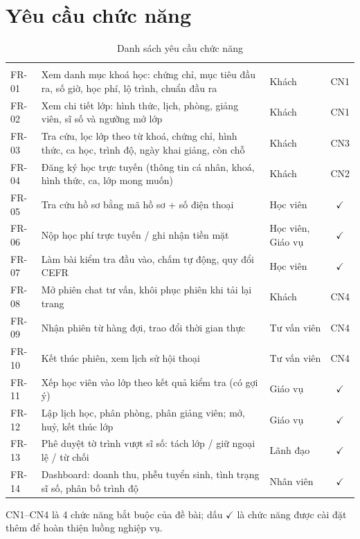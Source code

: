 \section{Yêu cầu chức năng}
\begin{xltabular}{\linewidth}{|l|Y|L{2.6cm}|c|}
  \caption{Danh sách yêu cầu chức năng}\label{tab:fr}\\ \hline
  \headrow {} &  &  &  \\ \hline
  \endfirsthead \hline
  \headrow {} &  &  &  \\ \hline
  \endhead
  FR-01 & Xem danh mục khoá học: chứng chỉ, mục tiêu đầu ra, số giờ, học phí, lộ trình, chuẩn đầu ra & Khách & CN1 \\ \hline
  FR-02 & Xem chi tiết lớp: hình thức, lịch, phòng, giảng viên, sĩ số và ngưỡng mở lớp & Khách & CN1 \\ \hline
  FR-03 & Tra cứu, lọc lớp theo từ khoá, chứng chỉ, hình thức, ca học, trình độ, ngày khai giảng, còn chỗ & Khách & CN3 \\ \hline
  FR-04 & Đăng ký học trực tuyến (thông tin cá nhân, khoá, hình thức, ca, lớp mong muốn) & Khách & CN2 \\ \hline
  FR-05 & Tra cứu hồ sơ bằng mã hồ sơ + số điện thoại & Học viên & $\checkmark$ \\ \hline
  FR-06 & Nộp học phí trực tuyến / ghi nhận tiền mặt & Học viên, Giáo vụ & $\checkmark$ \\ \hline
  FR-07 & Làm bài kiểm tra đầu vào, chấm tự động, quy đổi CEFR & Học viên & $\checkmark$ \\ \hline
  FR-08 & Mở phiên chat tư vấn, khôi phục phiên khi tải lại trang & Khách & CN4 \\ \hline
  FR-09 & Nhận phiên từ hàng đợi, trao đổi thời gian thực & Tư vấn viên & CN4 \\ \hline
  FR-10 & Kết thúc phiên, xem lịch sử hội thoại & Tư vấn viên & CN4 \\ \hline
  FR-11 & Xếp học viên vào lớp theo kết quả kiểm tra (có gợi ý) & Giáo vụ & $\checkmark$ \\ \hline
  FR-12 & Lập lịch học, phân phòng, phân giảng viên; mở, huỷ, kết thúc lớp & Giáo vụ & $\checkmark$ \\ \hline
  FR-13 & Phê duyệt tờ trình vượt sĩ số: tách lớp / giữ ngoại lệ / từ chối & Lãnh đạo & $\checkmark$ \\ \hline
  FR-14 & Dashboard: doanh thu, phễu tuyển sinh, tình trạng sĩ số, phân bố trình độ & Nhân viên & $\checkmark$ \\ \hline
\end{xltabular}
\noindent CN1–CN4 là 4 chức năng bắt buộc của đề bài; dấu $\checkmark$ là chức năng được cài đặt thêm để hoàn thiện luồng nghiệp vụ.

